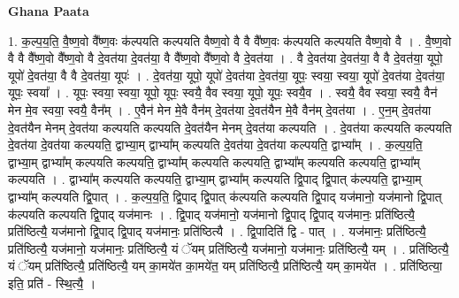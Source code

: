 \documentclass[17pt]{extarticle}
\begin{document}
\textbf{Ghana Paata } \newline

1. क॒ल्प॒य॒ति॒ वै॒ष्ण॒वो वै᳚ष्ण॒वः क॑ल्पयति कल्पयति वैष्ण॒वो वै वै वै᳚ष्ण॒वः क॑ल्पयति कल्पयति वैष्ण॒वो वै । . वै॒ष्ण॒वो वै वै वै᳚ष्ण॒वो वै᳚ष्ण॒वो वै दे॒वत॑या दे॒वत॑या॒ वै वै᳚ष्ण॒वो वै᳚ष्ण॒वो वै दे॒वत॑या । . वै दे॒वत॑या दे॒वत॑या॒ वै वै दे॒वत॑या॒ यूपो॒ यूपो॑ दे॒वत॑या॒ वै वै दे॒वत॑या॒ यूपः॑ । . दे॒वत॑या॒ यूपो॒ यूपो॑ दे॒वत॑या दे॒वत॑या॒ यूपः॒ स्वया॒ स्वया॒ यूपो॑ दे॒वत॑या दे॒वत॑या॒ यूपः॒ स्वया᳚ । . यूपः॒ स्वया॒ स्वया॒ यूपो॒ यूपः॒ स्वयै॒ वैव स्वया॒ यूपो॒ यूपः॒ स्वयै॒व । . स्वयै॒ वैव स्वया॒ स्वयै॒ वैन॑ मेन मे॒व स्वया॒ स्वयै॒ वैन᳚म् । . ए॒वैन॑ मेन मे॒वै वैन॑म् दे॒वत॑या दे॒वत॑यैन मे॒वै वैन॑म् दे॒वत॑या । . ए॒न॒म् दे॒वत॑या दे॒वत॑यैन मेनम् दे॒वत॑या कल्पयति कल्पयति दे॒वत॑यैन मेनम् दे॒वत॑या कल्पयति । . दे॒वत॑या कल्पयति कल्पयति दे॒वत॑या दे॒वत॑या कल्पयति॒ द्वाभ्या॒म् द्वाभ्या᳚म् कल्पयति दे॒वत॑या दे॒वत॑या कल्पयति॒ द्वाभ्या᳚म् । . क॒ल्प॒य॒ति॒ द्वाभ्या॒म् द्वाभ्या᳚म् कल्पयति कल्पयति॒ द्वाभ्या᳚म् कल्पयति कल्पयति॒ द्वाभ्या᳚म् कल्पयति कल्पयति॒ द्वाभ्या᳚म् कल्पयति । . द्वाभ्या᳚म् कल्पयति कल्पयति॒ द्वाभ्या॒म् द्वाभ्या᳚म् कल्पयति द्वि॒पाद् द्वि॒पात् क॑ल्पयति॒ द्वाभ्या॒म् द्वाभ्या᳚म् कल्पयति द्वि॒पात् । . क॒ल्प॒य॒ति॒ द्वि॒पाद् द्वि॒पात् क॑ल्पयति कल्पयति द्वि॒पाद् यज॑मानो॒ यज॑मानो द्वि॒पात् क॑ल्पयति कल्पयति द्वि॒पाद् यज॑मानः । . द्वि॒पाद् यज॑मानो॒ यज॑मानो द्वि॒पाद् द्वि॒पाद् यज॑मानः॒ प्रति॑ष्ठित्यै॒ प्रति॑ष्ठित्यै॒ यज॑मानो द्वि॒पाद् द्वि॒पाद् यज॑मानः॒ प्रति॑ष्ठित्यै । . द्वि॒पादिति॑ द्वि - पात् । . यज॑मानः॒ प्रति॑ष्ठित्यै॒ प्रति॑ष्ठित्यै॒ यज॑मानो॒ यज॑मानः॒ प्रति॑ष्ठित्यै॒ यं ॅयम् प्रति॑ष्ठित्यै॒ यज॑मानो॒ यज॑मानः॒ प्रति॑ष्ठित्यै॒ यम् । . प्रति॑ष्ठित्यै॒ यं ॅयम् प्रति॑ष्ठित्यै॒ प्रति॑ष्ठित्यै॒ यम् का॒मये॑त का॒मये॑त॒ यम् प्रति॑ष्ठित्यै॒ प्रति॑ष्ठित्यै॒ यम् का॒मये॑त । . प्रति॑ष्ठित्या॒ इति॒ प्रति॑ - स्थि॒त्यै॒ । \newline
\end{document}
